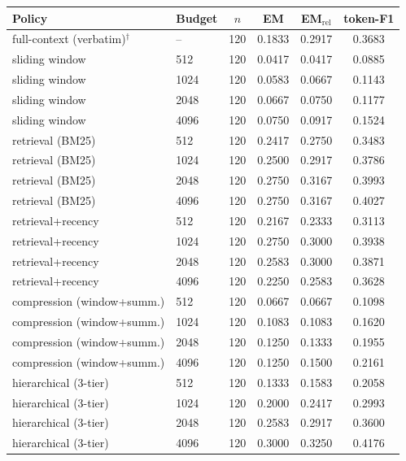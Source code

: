 \begin{tabular}{llcccc}
\toprule
Policy & Budget & $n$ & EM & EM$_{\text{rel}}$ & token-F1 \\
\midrule
full-context (verbatim)$^{\dagger}$ & -- & 120 & 0.1833 & 0.2917 & 0.3683 \\
sliding window & 512 & 120 & 0.0417 & 0.0417 & 0.0885 \\
sliding window & 1024 & 120 & 0.0583 & 0.0667 & 0.1143 \\
sliding window & 2048 & 120 & 0.0667 & 0.0750 & 0.1177 \\
sliding window & 4096 & 120 & 0.0750 & 0.0917 & 0.1524 \\
retrieval (BM25) & 512 & 120 & 0.2417 & 0.2750 & 0.3483 \\
retrieval (BM25) & 1024 & 120 & 0.2500 & 0.2917 & 0.3786 \\
retrieval (BM25) & 2048 & 120 & 0.2750 & 0.3167 & 0.3993 \\
retrieval (BM25) & 4096 & 120 & 0.2750 & 0.3167 & 0.4027 \\
retrieval+recency & 512 & 120 & 0.2167 & 0.2333 & 0.3113 \\
retrieval+recency & 1024 & 120 & 0.2750 & 0.3000 & 0.3938 \\
retrieval+recency & 2048 & 120 & 0.2583 & 0.3000 & 0.3871 \\
retrieval+recency & 4096 & 120 & 0.2250 & 0.2583 & 0.3628 \\
compression (window+summ.) & 512 & 120 & 0.0667 & 0.0667 & 0.1098 \\
compression (window+summ.) & 1024 & 120 & 0.1083 & 0.1083 & 0.1620 \\
compression (window+summ.) & 2048 & 120 & 0.1250 & 0.1333 & 0.1955 \\
compression (window+summ.) & 4096 & 120 & 0.1250 & 0.1500 & 0.2161 \\
hierarchical (3-tier) & 512 & 120 & 0.1333 & 0.1583 & 0.2058 \\
hierarchical (3-tier) & 1024 & 120 & 0.2000 & 0.2417 & 0.2993 \\
hierarchical (3-tier) & 2048 & 120 & 0.2583 & 0.2917 & 0.3600 \\
hierarchical (3-tier) & 4096 & 120 & 0.3000 & 0.3250 & 0.4176 \\
\bottomrule
\end{tabular}
